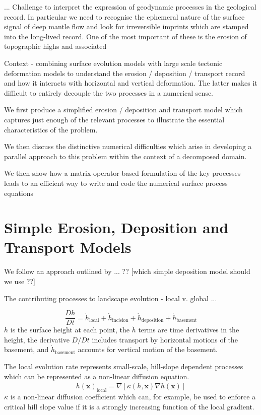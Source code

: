 \documentclass[draft,jgrga]{agu_template/AGUTeX}
\begin{document}
... Challenge to interpret the expression of geodynamic processes in the geological record. In particular we need to recognise the ephemeral nature of the surface signal of deep mantle flow and look for irreversible imprints which are stamped into the long-lived record. One of the most important of these is the erosion of topographic highs and associated

Context - combining surface evolution models with large scale tectonic deformation models to understand the erosion / deposition / transport record and how it interacts with horizontal and vertical deformation. The latter makes it difficult to entirely decouple the two processes in a numerical sense.


We first produce a simplified erosion / deposition and transport model which captures just enough of the relevant processes to illustrate the essential characteristics of the problem.

We then discuss the distinctive numerical difficulties which arise in developing a parallel approach to this problem within the context of a decomposed domain.

We then show how a matrix-operator based formulation of the key processes leads to an efficient way to write and code the numerical surface process equations

\section{Simple Erosion, Deposition and Transport Models}

We follow an approach outlined by ... ?? [which simple deposition model should we use ??]

The contributing processes to landscape evolution - local v. global ...

\begin{equation}
  \frac{Dh}{Dt} =  \dot{h}_\textrm{local}
  				 + \dot{h}_\textrm{incision}
  				 + \dot{h}_\textrm{deposition}
  				 + \dot{h}_\textrm{basement}
\end{equation}
$h$ is the surface height at each point, the $\dot{h}$ terms are time derivatives in the height, the derivative $D/Dt$ includes transport by horizontal motions of the basement, and $\dot{h}_\textrm{basement}$ accounts for vertical motion of the basement.

The local evolution rate represents small-scale, hill-slope dependent processes which can be represented as a non-linear diffusion equation.
\begin{equation}
	\dot{h}(\bm{x})_\textrm{local} = \nabla \left[\kappa(h,\bm{x}) \nabla h(\bm{x}) \right]
\end{equation}
$\kappa$ is a non-linear diffusion coefficient which can, for example, be used to enforce a
critical hill slope value if it is a strongly increasing function of the local gradient.
\end{document}
